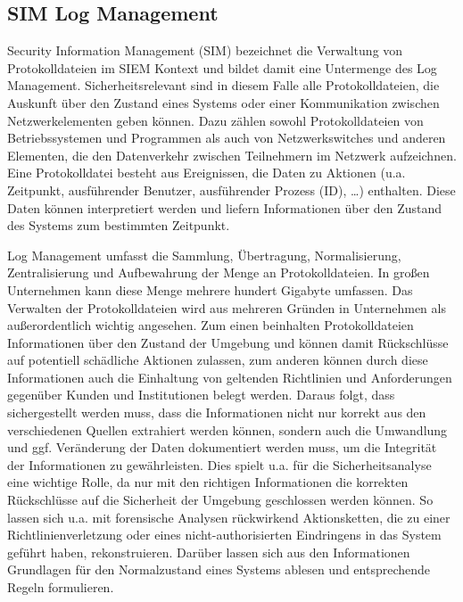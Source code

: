 \subsection{SIM \/ Log Management}
Security Information Management (SIM) bezeichnet die Verwaltung von Protokolldateien im SIEM Kontext und bildet damit eine Untermenge des Log Management. Sicherheitsrelevant sind in diesem Falle alle Protokolldateien, die Auskunft über den Zustand eines Systems oder einer Kommunikation zwischen Netzwerkelementen geben können. Dazu zählen sowohl Protokolldateien von Betriebssystemen und Programmen als auch von Netzwerkswitches und anderen Elementen, die den Datenverkehr zwischen Teilnehmern im Netzwerk aufzeichnen. Eine Protokolldatei besteht aus Ereignissen, die Daten zu Aktionen (u.a. Zeitpunkt, ausführender Benutzer, ausführender Prozess (ID), …) enthalten. Diese Daten können interpretiert werden und liefern Informationen über den Zustand des Systems zum bestimmten Zeitpunkt.

Log Management umfasst die Sammlung, Übertragung, Normalisierung, Zentralisierung und Aufbewahrung der Menge an Protokolldateien. In großen Unternehmen kann diese Menge mehrere hundert Gigabyte umfassen. Das Verwalten der Protokolldateien wird aus mehreren Gründen in Unternehmen als außerordentlich wichtig angesehen. Zum einen beinhalten Protokolldateien Informationen über den Zustand der Umgebung und können damit Rückschlüsse auf potentiell schädliche Aktionen zulassen, zum anderen können durch diese Informationen auch die Einhaltung von geltenden Richtlinien und Anforderungen gegenüber Kunden und Institutionen belegt werden. Daraus folgt, dass sichergestellt werden muss, dass die Informationen nicht nur korrekt aus den verschiedenen Quellen extrahiert werden können, sondern auch die Umwandlung und ggf. Veränderung der Daten dokumentiert werden muss, um die Integrität der Informationen zu gewährleisten. Dies spielt u.a. für die Sicherheitsanalyse eine wichtige Rolle, da nur mit den richtigen Informationen die korrekten Rückschlüsse auf die Sicherheit der Umgebung geschlossen werden können. So lassen sich u.a. mit forensische Analysen rückwirkend Aktionsketten, die zu einer Richtlinienverletzung oder eines nicht-authorisierten Eindringens in das System geführt haben, rekonstruieren. Darüber lassen sich aus den Informationen Grundlagen für den Normalzustand eines Systems ablesen und entsprechende Regeln formulieren.

